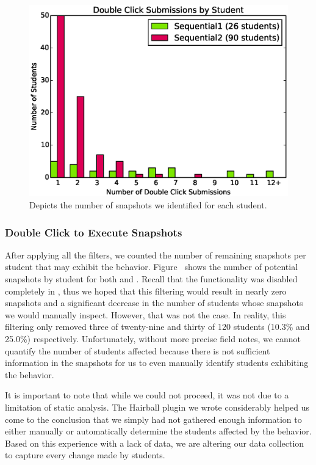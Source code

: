 \begin{figure}[!t]
\centering \includegraphics[width=5.25in]{graphs/dc_submissions.eps}
\caption{Depicts the number of \dce{} snapshots we identified for each
  student.}
\end{figure}

\subsubsection{Double Click to Execute Snapshots}

After applying all the filters, we counted the number of remaining snapshots
per student that may exhibit the \dce{}
behavior. Figure~ shows the number of potential
snapshots by student for both \sone{} and \stwo{}. Recall that the \dce{}
functionality was disabled completely in \stwo{}, thus we hoped that this
filtering would result in nearly zero \stwo{} snapshots and a significant
decrease in the number of \sone{} students whose snapshots we would manually
inspect. However, that was not the case. In reality, this filtering only
removed three of twenty-nine and thirty of 120 students (10.3\% and 25.0\%)
respectively. Unfortunately, without more precise field notes, we cannot
quantify the number of students affected because there is not sufficient
information in the snapshots for us to even manually identify students
exhibiting the \dce{} behavior.

It is important to note that while we could not proceed, it was not due to a
limitation of static analysis. The Hairball plugin we wrote considerably helped
us come to the conclusion that we simply had not gathered enough information to
either manually or automatically determine the students affected by the \dce{}
behavior. Based on this experience with a lack of data, we are altering our
data collection to capture every change made by students.
